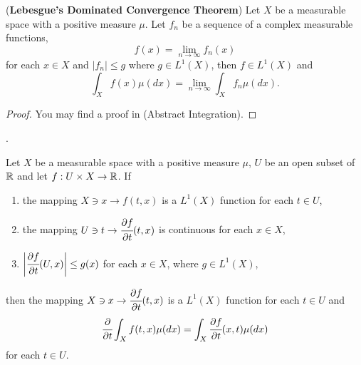 \documentclass[main.tex]{subfiles}
\begin{document}
\begin{theorem}
\label{dominated_covergence}
(\textbf{Lebesgue's Dominated Convergence Theorem})
Let $X$ be a measurable space with a positive measure $\mu$. Let $f_n$ be a sequence of a complex measurable functions, $$f(x) = \lim_{n\to\infty} f_n(x)$$ for each $x\in X$ and $|f_n| \leq g$ where $g\in L^1(X)$, then $f\in L^1(X)$ and
\begin{equation}
    \int_X f(x) \mu(dx) = \lim_{n\to\infty} \int_X f_n \mu(dx).
\end{equation}
\end{theorem}
\begin{proof}
You may find a proof in \cite{rudin1987}  (Abstract Integration).
\end{proof}.

\begin{theorem}
\label{lim_under_int_helper}
Let $X$ be a measurable space with a positive measure $\mu$, $U$ be an open subset of $\mathbb{R}$ and let $f:U\times X\to\mathbb{R}$. If
\begin{enumerate}
\item
the mapping $X\ni x \to f(t, x)$ is a $L^1(X)$ function for each $t\in U$,

\item
the mapping $U\ni t \to \cfrac{\partial f}{\partial t}(t,x)$ is continuous for each $x\in X$,

\item
$\bigg\rvert\cfrac{\partial f}{\partial t}(U, x)\bigg\lvert \leq g(x)$ for each $x\in X$, where $g\in L^1(X)$,
\end{enumerate}
then
the mapping $X\ni x \to \cfrac{\partial f}{\partial t}(t, x)$ is a $L^1(X)$ function for each $t\in U$ and
\begin{equation}
\cfrac{\partial }{\partial t}\int_X f(t, x) \mu(dx) = \int_X \cfrac{\partial f}{\partial t}(x, t) \mu(dx)  
\end{equation}
for each $t\in U$.

\end{theorem}
\end{document}
